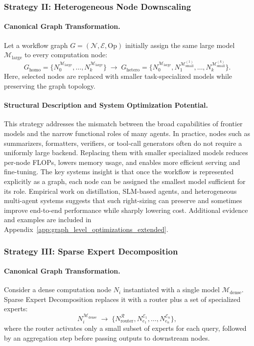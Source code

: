 \subsubsection{Strategy II: Heterogeneous Node Downscaling}
\label{sec:centralized_routing}

\paragraph{Canonical Graph Transformation.}
Let a workflow graph $G = (\mathcal{N}, \mathcal{E}, \text{Op})$ initially assign the same large model $\mathcal{M}_{\text{large}}$ to every computation node:
\[
G_{\text{homo}} =
\{N_0^{\mathcal{M}_{\text{large}}}, \ldots, N_k^{\mathcal{M}_{\text{large}}}\}
\;\longrightarrow\;
G_{\text{hetero}} =
\{N_0^{\mathcal{M}_{\text{large}}}, N_1^{\mathcal{M}_{\text{small}}^{(1)}}, \ldots, N_k^{\mathcal{M}_{\text{small}}^{(k)}}\}.
\]
Here, selected nodes are replaced with smaller task-specialized models while preserving the graph topology.

\paragraph{Structural Description and System Optimization Potential.}
This strategy addresses the mismatch between the broad capabilities of frontier models and the narrow functional roles of many agents. In practice, nodes such as summarizers, formatters, verifiers, or tool-call generators often do not require a uniformly large backend. Replacing them with smaller specialized models reduces per-node FLOPs, lowers memory usage, and enables more efficient serving and fine-tuning. The key systems insight is that once the workflow is represented explicitly as a graph, each node can be assigned the smallest model sufficient for its role. Empirical work on distillation, SLM-based agents, and heterogeneous multi-agent systems suggests that such right-sizing can preserve and sometimes improve end-to-end performance while sharply lowering cost. Additional evidence and examples are included in Appendix~\ref{app:graph_level_optimizations_extended}.

\subsubsection{Strategy III: Sparse Expert Decomposition}

\paragraph{Canonical Graph Transformation.}
Consider a dense computation node $N_i$ instantiated with a single model $\mathcal{M}_{\text{dense}}$. Sparse Expert Decomposition replaces it with a router plus a set of specialized experts:
\[
N_i^{\mathcal{M}_{\text{dense}}}
\;\longrightarrow\;
\bigl\{
N_{\text{router}}^{\mathcal{R}},
N_{e_1}^{\mathcal{E}_1},
\ldots,
N_{e_n}^{\mathcal{E}_n}
\bigr\},
\]
where the router activates only a small subset of experts for each query, followed by an aggregation step before passing outputs to downstream nodes.


